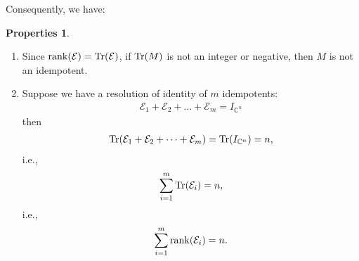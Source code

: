 \documentclass{article}
\theoremstyle{definition}
\newtheorem{prop}{Properties}[section]
\newcommand{\E}{\mathcal{E}}
\begin{document}
Consequently, we have:
\begin{prop}
	\begin{enumerate}
	\item Since $\rank(\E) = \Tr(\E)$, if $\Tr(M)$ is not an integer or negative, then $M$ is not an idempotent.
	
	\item Suppose we have a resolution of identity of $m$ idempotents: 
	\begin{align*}
	\E_1 + \E_2 + \dots + \E_m = I_{\mathbb{C}^n}
	\end{align*}
	then 
	\begin{align*}
	\Tr(\E_1 + \E_2 + \dots + \E_m) = \Tr(I_{\mathbb{C}^n}) = n,
	\end{align*}
	i.e.,
	\begin{align*}
	\sum_{i=1}^m \Tr(\E_i) = n,
	\end{align*}
	i.e.,
	\begin{align*}
	\sum_{i=1}^m \rank(\E_i) = n.
	\end{align*}
	
	
	

\end{enumerate}
\end{prop}
\end{document}
